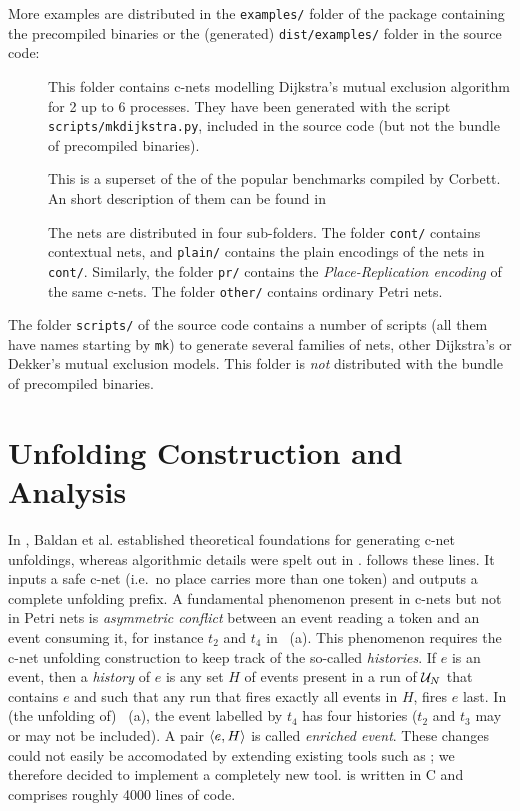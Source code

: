 \documentclass[a4paper]{refart}
\begin{document}
More examples are distributed in the \verb!examples/! folder of the package
containing the precompiled binaries or the (generated) \verb!dist/examples/!
folder in the source code:
\begin{description}
\item[]
  This folder contains c-nets modelling Dijkstra's mutual exclusion
  algorithm\cite{Dij65} for 2 up to 6 processes.
  They have been generated with the script \verb!scripts/mkdijkstra.py!,
  included in the source code (but not the bundle of precompiled binaries).

\item[]
  This is a superset of the of the popular benchmarks compiled by
  Corbett\cite{Cor96}.
  An short description of them can be found in\cite[--31]{Kho03}
  
  The nets are distributed in four sub-folders.
  The folder \verb!cont/! contains contextual nets,
  and \verb!plain/! contains the plain encodings of the nets in
  \verb!cont/!.  Similarly, the folder \verb!pr/! contains the
  \emph{Place-Replication encoding}\cite{VSY98} of the same c-nets.
  The folder \verb!other/! contains ordinary Petri nets.
\end{description}

The folder \verb!scripts/! of the source code contains a number of scripts (all
them have names starting by \verb!mk!) to generate several families of nets,
other Dijkstra's or Dekker's mutual exclusion models.
This folder is \emph{not} distributed with the bundle of precompiled binaries.

\iffalse%
\section{Unfolding Construction and Analysis}
\label{s:cons}

In \cite{BCKS08}, Baldan et al. established theoretical foundations for
generating c-net unfoldings, whereas algorithmic details were spelt out
in \cite{BBC+12}. \cunf{} follows these lines. It inputs a
safe c-net (i.e.\ no place carries more than one token)
and outputs a complete unfolding prefix. A fundamental phenomenon present
in c-nets but not in Petri nets is \emph{asymmetric conflict} between an
event reading a token and an event consuming it, for instance
$t_2$ and $t_4$ in ~(a).
This phenomenon requires the c-net unfolding construction
to keep track of the so-called \emph{histories}. If $e$ is an event,
then 
a \emph{history} of $e$ is any set $H$ of events present in a run of
$\mathcal{U}_{N}$ that contains $e$ and such that any run that fires exactly all events
in $H$, fires $e$ last.
In (the unfolding of) ~(a), the event labelled by $t_4$ has four
histories ($t_2$ and $t_3$ may or may not be included).
A pair $\langle e, H\rangle$ is called \emph{enriched event}. These changes could
not easily be accomodated by extending existing tools such as \mole{};
we therefore decided to implement a completely new tool. \cunf{} is written
in C and comprises roughly 4000 lines of code.
\end{document}
